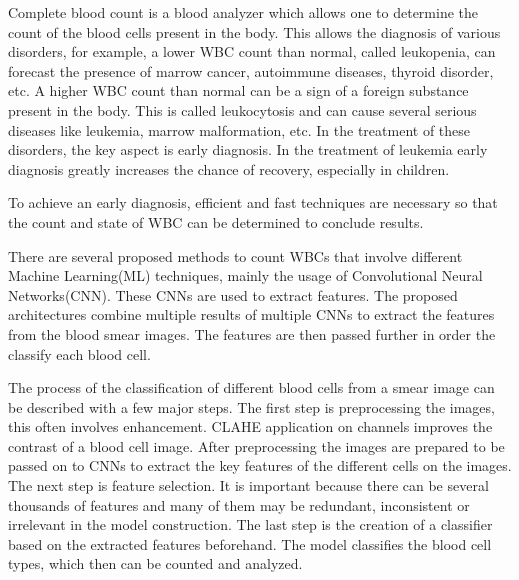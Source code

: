 Complete blood count
is a blood analyzer which allows one to determine the count of the blood cells present in the body. This allows the diagnosis of various disorders, for example, a lower WBC count than normal, called leukopenia, can forecast the presence of marrow cancer, autoimmune diseases, thyroid disorder, etc. A higher WBC count than normal can be a sign of a foreign substance present in the body. This is called leukocytosis and can cause several serious diseases like leukemia, marrow malformation, etc. In the treatment of these disorders, the key aspect is early diagnosis. In the treatment of leukemia early diagnosis greatly increases the chance of recovery, especially in children.

To achieve an early diagnosis, efficient and fast techniques are necessary so that the count and state of WBC can be determined to conclude results. 

There are several proposed methods to count WBCs that involve different Machine Learning(ML) techniques, mainly the usage of Convolutional Neural Networks(CNN). These CNNs are used to extract features. The proposed architectures combine multiple results of multiple CNNs to extract the features from the blood smear images. The features are then passed further in order the classify each blood cell.

The process of the classification of different blood cells from a smear image can be described with a few major steps. The first step is preprocessing the images, this often involves enhancement. CLAHE
application on channels improves the contrast of a blood cell image. After preprocessing the images are prepared to be passed on to CNNs to extract the key features of the different cells on the images. The next step is feature selection. It is important because there can be several thousands of features and many of them may be redundant, inconsistent or irrelevant in the model construction. The last step is the creation of a classifier based on the extracted features beforehand. The model classifies the blood cell types, which then can be counted and analyzed.

